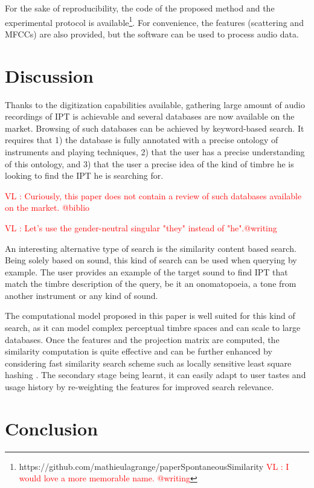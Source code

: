 \documentclass{article}
\newcommand{\ipt}{IPT\xspace}
\newcommand{\vl}[1]{\textcolor{red}{VL : #1}}
\begin{document}
For the sake of reproducibility, the code of the proposed method and the experimental protocol is available\footnote{https://github.com/mathieulagrange/paperSpontaneousSimilarity \vl{I would love a more memorable name. @writing}}. For convenience, the features (scattering and MFCCs) are also provided, but the software can be used to process audio data.

\section{Discussion}\label{sec:discussion}

Thanks to the digitization capabilities available, gathering large amount of audio recordings of \ipt is achievable and several databases are now available on the market. Browsing of such databases can be achieved by keyword-based search. It requires that 1) the database is fully annotated with a precise ontology of instruments and playing techniques, 2) that the user has a precise understanding of this ontology, and 3) that the user a precise idea of the kind of timbre he is looking to find the \ipt he is searching for.

\vl{Curiously, this paper does not contain a review of such databases available on the market. @biblio}

\vl{Let's use the gender-neutral singular "they" instead of "he".@writing}


An interesting alternative type of search is the similarity content based search. Being solely based on sound, this kind of search can be used when querying by example. The user provides an example of the target sound to find \ipt that match the timbre description of the query, be it an onomatopoeia, a tone from another instrument or any kind of sound.

The computational model proposed in this paper is well suited for this kind of search, as it can model complex perceptual timbre spaces and can scale to large databases. Once the features and the projection matrix are computed, the similarity computation is quite effective and can be further enhanced by considering fast similarity search scheme such as locally sensitive least square hashing \cite{pauleve2010locality}. The secondary stage being learnt, it can easily adapt to user tastes and usage history by re-weighting the features for improved search relevance.

\section{Conclusion}
\end{document}
